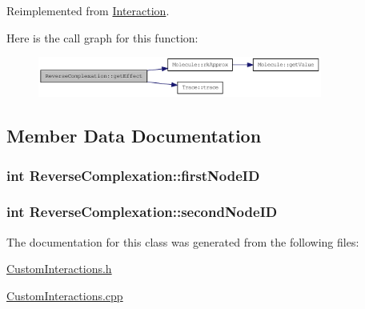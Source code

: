 Reimplemented from \hyperlink{classInteraction_a6328831e714adf9c8177f6052d2e017f}{Interaction}.

Here is the call graph for this function:\nopagebreak
\begin{figure}[H]
\begin{center}
\leavevmode
\includegraphics[width=265pt]{classReverseComplexation_a9dceec2b67efbe7c14a7e53c959263f5_cgraph}
\end{center}
\end{figure}


\subsection{Member Data Documentation}
\hypertarget{classReverseComplexation_aa9ed054c37191c54e372b941eb49478f}{
\subsubsection[{firstNodeID}]{\setlength{\rightskip}{0pt plus 5cm}int {\bf ReverseComplexation::firstNodeID}}}
\label{classReverseComplexation_aa9ed054c37191c54e372b941eb49478f}
\hypertarget{classReverseComplexation_a2d42a108e3fce695be1b9867e4f16ec4}{
\subsubsection[{secondNodeID}]{\setlength{\rightskip}{0pt plus 5cm}int {\bf ReverseComplexation::secondNodeID}}}
\label{classReverseComplexation_a2d42a108e3fce695be1b9867e4f16ec4}


The documentation for this class was generated from the following files:\begin{DoxyCompactItemize}
\item 
\hyperlink{CustomInteractions_8h}{CustomInteractions.h}\item 
\hyperlink{CustomInteractions_8cpp}{CustomInteractions.cpp}\end{DoxyCompactItemize}
